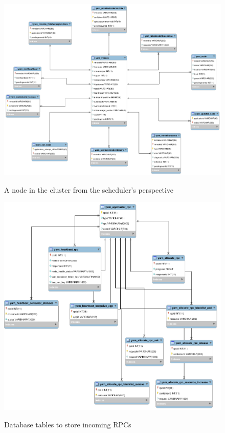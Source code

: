 \begin{figure}
\centering
\includegraphics[scale=0.4]{resources/images/Implementation/hops_yarn_ndb_schema_rmnode.png}
\label{fig:impl_fk_yarn_rmnode}
\caption{A node in the cluster from the scheduler's perspective}
\end{figure}

\begin{figure}
\centering
\includegraphics[scale=0.4]{resources/images/Implementation/hops_yarn_ndb_schema_rpc.png}
\label{fig:impl_fk_yarn_rpc}
\caption{Database tables to store incoming RPCs}
\end{figure}

